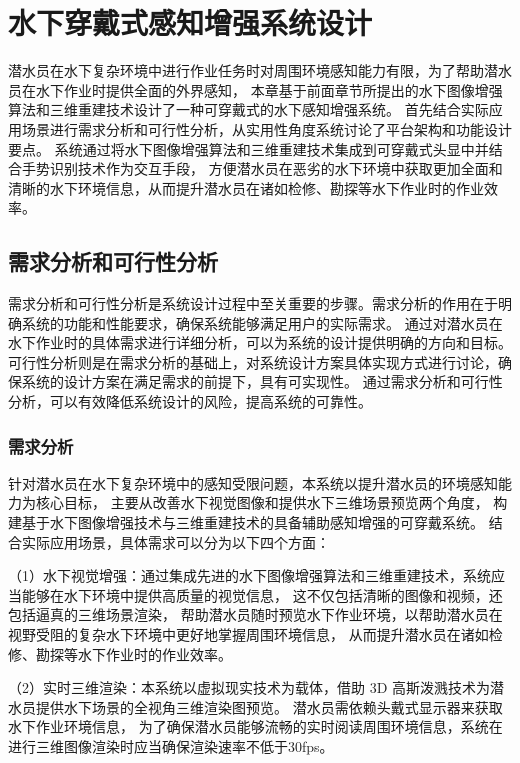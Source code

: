 
\chapter{水下穿戴式感知增强系统设计}
潜水员在水下复杂环境中进行作业任务时对周围环境感知能力有限，为了帮助潜水员在水下作业时提供全面的外界感知，
本章基于前面章节所提出的水下图像增强算法和三维重建技术设计了一种可穿戴式的水下感知增强系统。
首先结合实际应用场景进行需求分析和可行性分析，从实用性角度系统讨论了平台架构和功能设计要点。
系统通过将水下图像增强算法和三维重建技术集成到可穿戴式头显中并结合手势识别技术作为交互手段，
方便潜水员在恶劣的水下环境中获取更加全面和清晰的水下环境信息，从而提升潜水员在诸如检修、勘探等水下作业时的作业效率。

\section{需求分析和可行性分析}

需求分析和可行性分析是系统设计过程中至关重要的步骤。需求分析的作用在于明确系统的功能和性能要求，确保系统能够满足用户的实际需求。
通过对潜水员在水下作业时的具体需求进行详细分析，可以为系统的设计提供明确的方向和目标。
可行性分析则是在需求分析的基础上，对系统设计方案具体实现方式进行讨论，确保系统的设计方案在满足需求的前提下，具有可实现性。
通过需求分析和可行性分析，可以有效降低系统设计的风险，提高系统的可靠性。

\subsection{需求分析}
针对潜水员在水下复杂环境中的感知受限问题，本系统以提升潜水员的环境感知能力为核心目标，
主要从改善水下视觉图像和提供水下三维场景预览两个角度，
构建基于水下图像增强技术与三维重建技术的具备辅助感知增强的可穿戴系统。
结合实际应用场景，具体需求可以分为以下四个方面：

（1）水下视觉增强：通过集成先进的水下图像增强算法和三维重建技术，系统应当能够在水下环境中提供高质量的视觉信息，
这不仅包括清晰的图像和视频，还包括逼真的三维场景渲染，
帮助潜水员随时预览水下作业环境，以帮助潜水员在视野受阻的复杂水下环境中更好地掌握周围环境信息，
从而提升潜水员在诸如检修、勘探等水下作业时的作业效率。

（2）实时三维渲染：本系统以虚拟现实技术为载体，借助 3D 高斯泼溅技术为潜水员提供水下场景的全视角三维渲染图预览。
潜水员需依赖头戴式显示器来获取水下作业环境信息，
为了确保潜水员能够流畅的实时阅读周围环境信息，系统在进行三维图像渲染时应当确保渲染速率不低于30fps。

